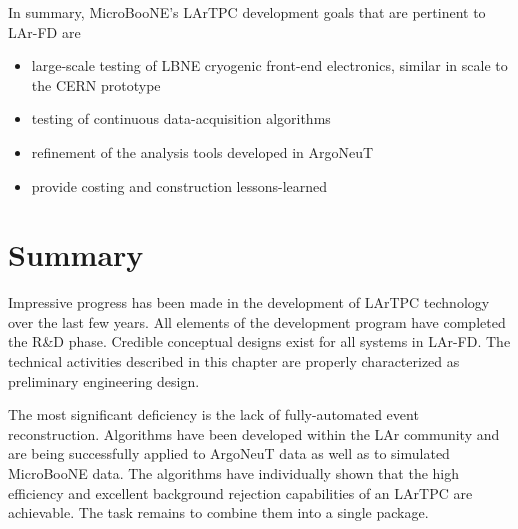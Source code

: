 \noindent  In summary, MicroBooNE's LArTPC development goals that are pertinent to LAr-FD are
\begin{itemize}
\item large-scale testing of LBNE cryogenic front-end electronics, similar in scale to the CERN prototype
\item testing of continuous data-acquisition algorithms
\item refinement of the analysis tools developed in ArgoNeuT
\item provide costing and construction lessons-learned
\end{itemize}

\section{Summary}

Impressive progress has been made in the development of LArTPC technology over the last few years. All elements of the development program have completed the R\&D phase. Credible conceptual designs exist for all systems in LAr-FD. The technical activities described in this chapter are properly characterized as preliminary engineering design.

The most significant deficiency is the lack of fully-automated event reconstruction. Algorithms have been developed within the LAr community and are being successfully applied to ArgoNeuT data as well as to simulated MicroBooNE data. The algorithms have individually shown that the high efficiency and excellent background rejection capabilities of an LArTPC are achievable. The task remains to combine them into a single package. 



